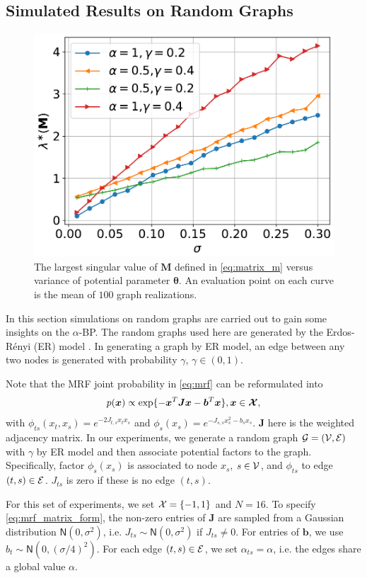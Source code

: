 \subsection{Simulated Results on Random Graphs}
\begin{figure}[!t]
  \centering
  \includegraphics[width=0.6\columnwidth]{figures/converge/contraction_vs_variance_r1-crop.pdf}
  \caption{The largest singular value of $\bm{M}$ defined in \eqref{eq:matrix_m} versus variance of potential parameter $\bm{\theta}$. An evaluation point on each curve is the mean of $100$ graph realizations.}
  \label{fig:largest_singular}
\end{figure}


In this section simulations on random graphs are carried out
to gain some insights on the $\alpha$-BP. The random graphs used here are generated
by the Erdos-R\'enyi (ER) model \cite{erdos1960}. In generating a graph by ER model, an edge between any two nodes is generated with probability $\gamma$, $\gamma \in (0,1)$.

Note that the MRF joint probability in \eqref{eq:mrf} can be reformulated into
\begin{equation}\label{eq:mrf_matrix_form}
  p(\bm{x}) \propto \exp\{-\bm{x}^{T}\bm{J}\bm{x} - \bm{b}^{T}\bm{x}\}, \bm{x} \in \bm{\mathcal{X}},
\end{equation}
with $\phi_{ts}(x_t, x_s) = e^{- 2 J_{t,s} x_t x_s}$ and $\phi_s(x_s) = e^{ - J_{s,s} x_s^2 - b_s  x_s}$. $\bm{J}$ here is the weighted adjacency matrix. In our experiments, we generate a random graph $\mathcal{G} = (\mathcal{V}, \mathcal{E})$ with $\gamma$ by ER model and then associate potential factors to the graph. Specifically, factor $\phi_s(x_s)$ is associated to node $x_s$, $s \in \mathcal{V}$, and $\phi_{ts}$ to edge $(t, s) \in \mathcal{E}$. $J_{ts}$ is zero if these is no edge $(t, s)$.

For this set of experiments, we set $\mathcal{X} = \left\{ -1, 1 \right\}$ and $N=16$. To specify \eqref{eq:mrf_matrix_form}, the non-zero entries of $\bm{J}$ are sampled from a Gaussian distribution $\mathsf{N}(0, \sigma^2)$, i.e. $J_{ts} \sim \mathsf{N}(0, \sigma^2)$ if $J_{ts}\neq 0$. For entries of $\bm{b}$, we use $b_t \sim \mathsf{N}(0, (\sigma/4)^2)$.
For each edge $(t,s) \in \mathcal{E}$, we set $\alpha_{ts}=\alpha$, i.e. the edges share a global value $\alpha$.

